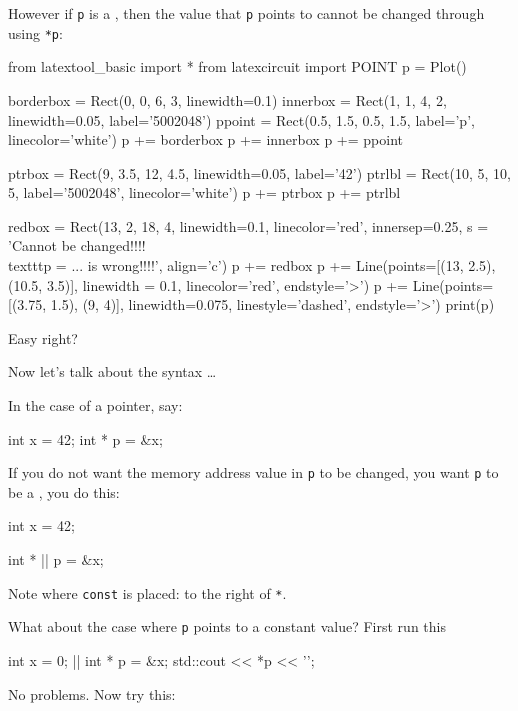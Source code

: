 However if \texttt{p} is a , then the value that \texttt{p} points to cannot be changed through using \texttt{*p}:

\begin{python}
from latextool_basic import *
from latexcircuit import POINT
p = Plot()

borderbox = Rect(0, 0, 6, 3, linewidth=0.1)
innerbox = Rect(1, 1, 4, 2, linewidth=0.05, label='5002048')
ppoint = Rect(0.5, 1.5, 0.5, 1.5, label='p', linecolor='white')
p += borderbox
p += innerbox
p += ppoint

ptrbox = Rect(9, 3.5, 12, 4.5, linewidth=0.05, label='42')
ptrlbl = Rect(10, 5, 10, 5, label='5002048', linecolor='white')
p += ptrbox
p += ptrlbl

redbox = Rect(13, 2, 18, 4, linewidth=0.1, linecolor='red', innersep=0.25, s = 'Cannot be changed!!!! \\texttt{p = ...} is wrong!!!!', align='c')
p += redbox
p += Line(points=[(13, 2.5), (10.5, 3.5)], linewidth = 0.1, linecolor='red', endstyle='>')
p += Line(points=[(3.75, 1.5), (9, 4)], linewidth=0.075, linestyle='dashed', endstyle='>')
print(p)
\end{python}

Easy right?

Now let's talk about the syntax \ldots{}

In the case of a pointer, say:

\begin{consolethree}[escapeinside=||]
int x = 42;
int * p = &x;
\end{consolethree}

If you do not want the memory address value in \texttt{p} to be changed, you want \texttt{p} to be a , you do this:

\begin{consolethree}[escapeinside=||]
int x = 42;

int * || p = &x;
\end{consolethree}
Note where \texttt{const} is placed: to the right of \texttt{*}.

What about the case where \texttt{p} points to a constant value? First run this

\begin{consolethree}[escapeinside=||]
int x = 0;
|| int * p = &x;
std::cout << *p << '\n';
\end{consolethree}
No problems. Now try this:

